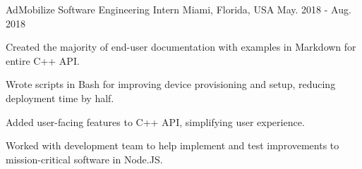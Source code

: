 \begin{cventries}

  \cventry
    {AdMobilize} %
    {Software Engineering Intern} %
    {Miami, Florida, USA} %
    {May. 2018 - Aug. 2018} %
    {
      \begin{cvitems} %
        \item {Created the majority of end-user documentation with examples in Markdown for entire C++ API.}
        \item {Wrote scripts in Bash for improving device provisioning and setup, reducing deployment time by half.}
        \item {Added user-facing features to C++ API, simplifying user experience.}
        \item {Worked with development team to help implement and test improvements to mission-critical software in Node.JS.}
      \end{cvitems}
    }


\end{cventries}
